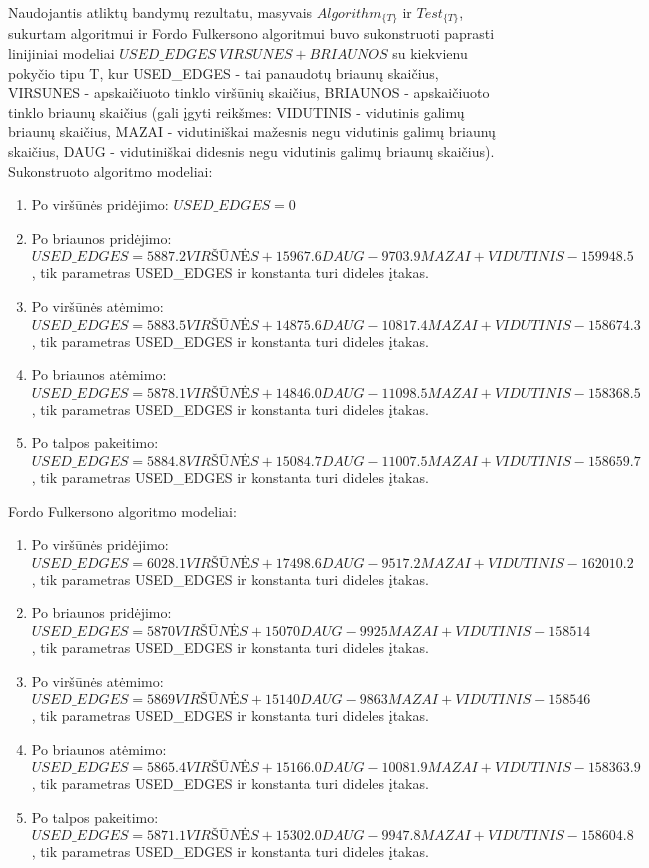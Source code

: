 Naudojantis atliktų bandymų rezultatu, masyvais $Algorithm_{\{T\}}$ ir $Test_{\{T\}}$,  sukurtam algoritmui ir Fordo Fulkersono algoritmui buvo sukonstruoti paprasti linijiniai modeliai $USED\_EDGES ~ VIRSUNES + BRIAUNOS$ su kiekvienu pokyčio tipu T, kur USED\_EDGES - tai panaudotų briaunų skaičius, VIRSUNES - apskaičiuoto tinklo viršūnių skaičius, BRIAUNOS - apskaičiuoto tinklo briaunų skaičius (gali įgyti reikšmes: VIDUTINIS - vidutinis galimų briaunų skaičius, MAZAI - vidutiniškai mažesnis negu vidutinis galimų briaunų skaičius, DAUG - vidutiniškai didesnis negu vidutinis galimų briaunų skaičius). Sukonstruoto algoritmo modeliai:
\begin{enumerate}
	\item Po viršūnės pridėjimo: $USED\_EDGES = 0$
	\item Po briaunos pridėjimo: $USED\_EDGES = 5887.2VIRŠŪNĖS + 15967.6DAUG - 9703.9MAZAI + VIDUTINIS - 159948.5$, tik parametras USED\_EDGES ir konstanta turi dideles įtakas.
	\item Po viršūnės atėmimo: $USED\_EDGES = 5883.5VIRŠŪNĖS + 14875.6DAUG - 10817.4MAZAI + VIDUTINIS - 158674.3$, tik parametras USED\_EDGES ir konstanta turi dideles įtakas.
	\item Po briaunos atėmimo: $USED\_EDGES = 5878.1VIRŠŪNĖS + 14846.0DAUG -11098.5MAZAI + VIDUTINIS - 158368.5$, tik parametras USED\_EDGES ir konstanta turi dideles įtakas.
	\item Po talpos pakeitimo: $USED\_EDGES = 5884.8VIRŠŪNĖS + 15084.7DAUG - 11007.5MAZAI + VIDUTINIS - 158659.7$, tik parametras USED\_EDGES ir konstanta turi dideles įtakas.
\end{enumerate}
Fordo Fulkersono algoritmo modeliai:
\begin{enumerate}
	\item Po viršūnės pridėjimo: $USED\_EDGES =6028.1VIRŠŪNĖS + 17498.6DAUG - 9517.2MAZAI + VIDUTINIS - 162010.2$, tik parametras USED\_EDGES ir konstanta turi dideles įtakas.
	\item Po briaunos pridėjimo: $USED\_EDGES = 5870VIRŠŪNĖS + 15070DAUG - 9925MAZAI + VIDUTINIS - 158514$, tik parametras USED\_EDGES ir konstanta turi dideles įtakas.
	\item Po viršūnės atėmimo: $USED\_EDGES = 5869VIRŠŪNĖS + 15140DAUG -9863MAZAI + VIDUTINIS - 158546$, tik parametras USED\_EDGES ir konstanta turi dideles įtakas.
	\item Po briaunos atėmimo: $USED\_EDGES = 5865.4VIRŠŪNĖS + 15166.0DAUG - 10081.9MAZAI + VIDUTINIS - 158363.9$, tik parametras USED\_EDGES ir konstanta turi dideles įtakas.
	\item Po talpos pakeitimo: $USED\_EDGES = 5871.1VIRŠŪNĖS + 15302.0DAUG - 9947.8MAZAI + VIDUTINIS - 158604.8$, tik parametras USED\_EDGES ir konstanta turi dideles įtakas.
\end{enumerate}

